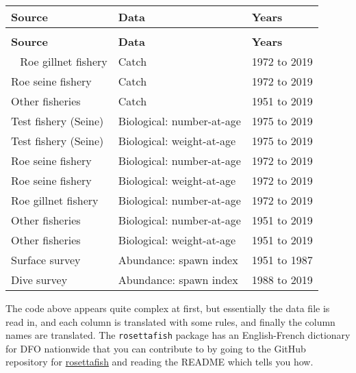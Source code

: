 \documentclass[12pt]{article}\usepackage[]{graphicx}\usepackage[]{color}
\begin{document}
\begin{longtable}[t]{lll}
\caption{\label{tab:herring}}\\
\toprule
\textbf{Source} & \textbf{Data} & \textbf{Years}\\
\midrule
\endfirsthead
\caption*{}\\
\toprule
\textbf{Source} & \textbf{Data} & \textbf{Years}\\
\midrule
\endhead
\
\endfoot
\bottomrule
\endlastfoot
Roe gillnet fishery & Catch & 1972 to 2019\\
Roe seine fishery & Catch & 1972 to 2019\\
Other fisheries & Catch & 1951 to 2019\\
Test fishery (Seine) & Biological: number-at-age & 1975 to 2019\\
Test fishery (Seine) & Biological: weight-at-age & 1975 to 2019\\
Roe seine fishery & Biological: number-at-age & 1972 to 2019\\
Roe seine fishery & Biological: weight-at-age & 1972 to 2019\\
Roe gillnet fishery & Biological: number-at-age & 1972 to 2019\\
Other fisheries & Biological: number-at-age & 1951 to 2019\\
Other fisheries & Biological: weight-at-age & 1951 to 2019\\
Surface survey & Abundance: spawn index & 1951 to 1987\\
Dive survey & Abundance: spawn index & 1988 to 2019\\*
\end{longtable}
The code above appears quite complex at first, but essentially the data file is read in, and each column is translated with some rules, and finally the column names are translated. The \texttt{rosettafish} package has an English-French dictionary for DFO nationwide that you can contribute to by going to the GitHub repository for \href{https://github.com/pbs-assess/rosettafish}{rosettafish} and reading the README which tells you how.
\end{document}
